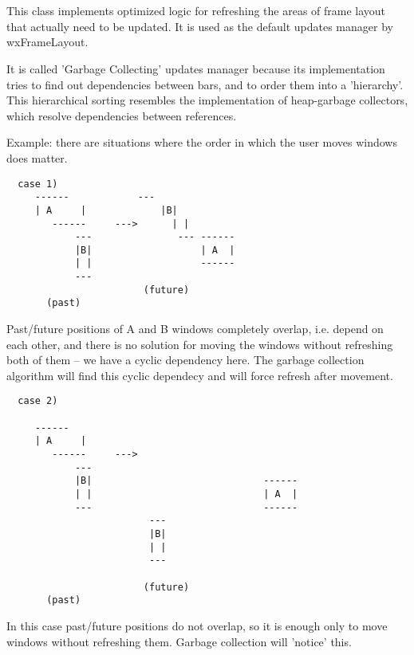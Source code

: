 %
%


\section{}\label{cbgcupdatesmgr}


This class implements optimized logic for refreshing
the areas of frame layout that actually need to be updated.
It is used as the default updates manager by wxFrameLayout.

It is called 'Garbage Collecting' updates manager because
its implementation tries to find out dependencies between bars,
and to order them into a 'hierarchy'. This hierarchical sorting resembles
the implementation of heap-garbage collectors, which resolve
dependencies between references.

Example: there are situations where the order in which the user
moves windows does matter.

\begin{verbatim}
  case 1)
     ------            ---
     | A     |             |B|
        ------     --->      | |
            ---               --- ------
            |B|                   | A  |
            | |                   ------
            ---
                        (future)
       (past)
\end{verbatim}

Past/future positions of A and B windows completely overlap, i.e.
depend on each other, and there is no solution for
moving the windows without refreshing both of them
-- we have a cyclic dependency here. The garbage collection algorithm will
find this cyclic dependecy and will force refresh after movement.

\begin{verbatim}
  case 2)

     ------
     | A     |
        ------     --->
            ---
            |B|                              ------
            | |                              | A  |
            ---                              ------
                         ---
                         |B|
                         | |
                         ---

                        (future)
       (past)
\end{verbatim}

In this case past/future positions do not overlap, so
it is enough only to move windows without refreshing them.
Garbage collection will 'notice' this.

